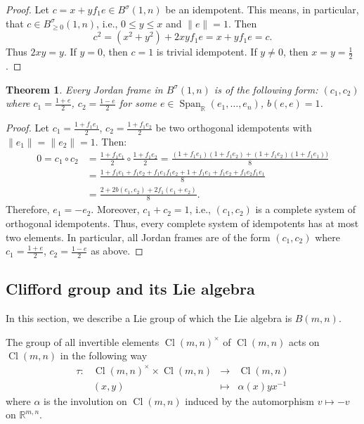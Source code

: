 \documentclass[a4paper,oneside,11pt]{amsart}
\DeclareMathOperator{\Span}{Span}
\DeclareMathOperator{\Cl}{Cl}
\newcommand{\R}{\mathbb R}
\theoremstyle{plain}
\newtheorem{teo}{Theorem}[section]
\theoremstyle{definition}
\theoremstyle{remark}
\begin{document}
\begin{proof}
Let $c=x+yf_1e\in B^{\sigma}(1,n)$ be an idempotent. This means, in particular, that $c\in B_{\geq 0}^{\sigma}(1,n)$, i.e., $0 \leq y \leq x$ and $\|e\|=1$. Then
$$c^2=(x^2+y^2)+2xyf_1e=x+yf_1e=c.$$
Thus $2xy=y$. If $y=0$, then $c=1$ is trivial idempotent. If $y\neq 0$, then $x=y=\frac{1}{2}$.
\end{proof}


\begin{teo}\label{JB-clif}
Every Jordan frame in $B^{\sigma}(1,n)$ is of the following form: $(c_1,c_2)$ where $c_1=\frac{1+e}{2}$, $c_2=\frac{1-e}{2}$ for some $e\in\Span_\R(e_1,\dots,e_n)$, $b(e,e)=1$.
\end{teo}

\begin{proof}
Let $c_1=\frac{1+f_1e_1}{2}$, $c_2=\frac{1+f_1e_2}{2}$ be two orthogonal idempotents with $\|e_1\|=\|e_2\|=1$. Then:
\begin{align*}
    0=c_1\circ c_2&=\frac{1+f_1e_1}{2}\circ\frac{1+f_1e_2}{2}=\frac{(1+f_1e_1)(1+f_1e_2)+(1+f_1e_2)(1+f_1e_1))}{8}\\
    &=\frac{1+f_1e_1+f_1e_2+f_1e_1f_1e_2+1+f_1e_1+f_1e_2+f_1e_2f_1e_1}{8}\\
    &=\frac{2+2b(e_1,e_2)+2f_1(e_1+e_2)}{8}.
\end{align*}
Therefore, $e_1=-e_2$. Moreover, $c_1+c_2=1$, i.e., $(c_1,c_2)$ is a complete system of orthogonal idempotents. Thus, every complete system of idempotents has at most two elements. In particular, all Jordan frames are of the form $(c_1,c_2)$ where $c_1=\frac{1+e}{2}$, $c_2=\frac{1-e}{2}$ as above.
\end{proof}

\subsection{Clifford group and its Lie algebra}

In this section, we describe a Lie group of which the Lie algebra is $B(m,n)$.

The group of all invertible elements $\Cl(m,n)^\times$ of $\Cl(m,n)$ acts on $\Cl(m,n)$ in the following way
\begin{equation}\label{eq:Clifford-tau}
    \begin{matrix}
    \tau\colon & \Cl(m,n)^\times\times\Cl(m,n) & \to & \Cl(m,n) \\
     & (x,y) & \mapsto & \alpha(x)y x^{-1}
\end{matrix}    
\end{equation}
where $\alpha$ is the involution on $\Cl(m,n)$ induced by the automorphism $v\mapsto -v$ on $\R^{m,n}$.
\end{document}
